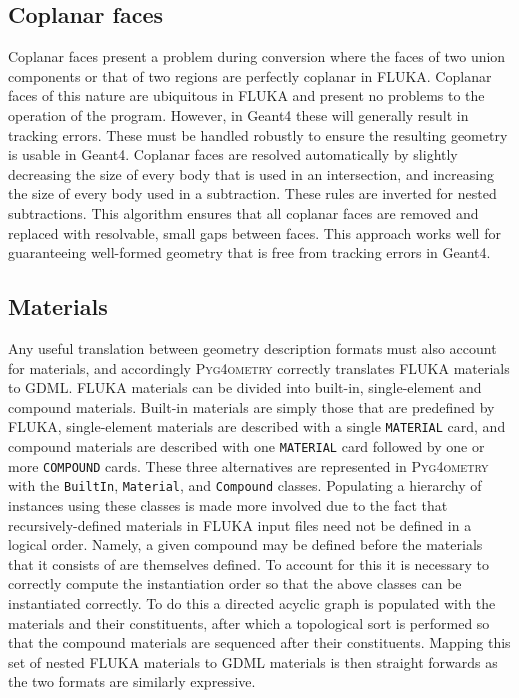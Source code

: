 \documentclass[preprint,12pt]{elsarticle}
\newcommand{\pyinline}[1]{\lstinline[postbreak={}]{#1}}
\newcommand{\fluka}[1]{\texttt{\MakeUppercase{#1}}}
\newcommand{\PYGEOMETRY}{\textsc{Pyg4ometry}}
\begin{document}
\subsection{Coplanar faces}
Coplanar faces present a problem during conversion where the faces of two
union components or that of two regions are perfectly coplanar in FLUKA.
Coplanar faces of this nature are ubiquitous in FLUKA and present no
problems to the operation of the program.  However, in Geant4 these will
generally result in tracking errors.  These must be handled robustly to
ensure the resulting geometry is usable in Geant4.  Coplanar faces are resolved
automatically by slightly decreasing the size of every body that is used in
an intersection, and increasing the size of every body used in a
subtraction.  These rules are inverted for nested subtractions.  This
algorithm ensures that all coplanar faces are removed and replaced with
resolvable, small gaps between faces.  This approach works well for
guaranteeing well-formed geometry that is free from tracking errors in Geant4.

\subsection{Materials}

Any useful translation between geometry description formats must also
account for materials, and accordingly \PYGEOMETRY{} correctly translates
FLUKA materials to GDML.  FLUKA materials can be divided into built-in,
single-element and compound materials.  Built-in materials are simply those
that are predefined by FLUKA, single-element materials are described with a
single \fluka{material} card, and compound materials are described with one
\fluka{material} card followed by one or more \fluka{compound} cards.
These three alternatives are represented in \PYGEOMETRY{} with the
\pyinline{BuiltIn}, \pyinline{Material}, and \pyinline{Compound} classes.
Populating a hierarchy of instances using these classes is made more involved due to
the fact that recursively-defined materials in FLUKA input files need not
be defined in a logical order.  Namely, a given compound may be
defined before the materials that it consists of are themselves defined.
To account for this it is necessary to correctly compute the instantiation
order so that the above classes can be instantiated correctly.  To do this
a directed acyclic graph is populated with the materials and their
constituents, after which a topological sort is performed so that the
compound materials are sequenced after their constituents.  Mapping this
set of nested FLUKA materials to GDML materials is then
straight forwards as the two formats are similarly expressive.
\end{document}
